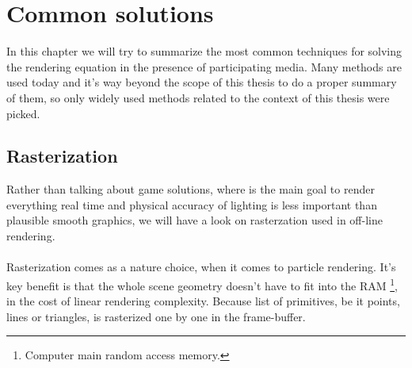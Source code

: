 \chapter{Common solutions}
In this chapter we will try to summarize the most common techniques for solving the rendering equation in the presence of participating media. Many methods are used today and it's way beyond the scope of this thesis to do a proper summary of them, so only widely used methods related to the context of this thesis were picked.
\section{ Rasterization}
Rather than talking about game solutions, where is the main goal to render everything real time and physical accuracy of lighting is less important than plausible smooth graphics, we will have a look on rasterzation used in off-line rendering.
\\
\\
Rasterization comes as a nature choice, when it comes to particle rendering. It's key benefit is that the whole scene geometry doesn't have to fit into the RAM \footnote{Computer main random access memory.}, in the cost of linear rendering complexity. Because list of primitives, be it points, lines or triangles, is rasterized one by one in the frame-buffer.

